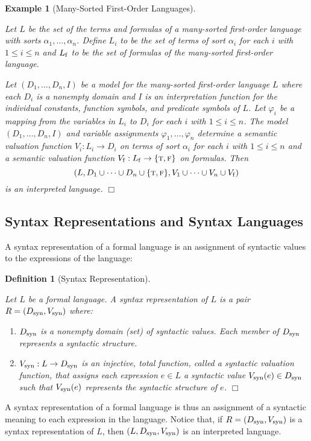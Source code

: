 \documentclass[11pt,fleqn]{article}
\newcommand{\be}{\begin{enumerate}}
\newcommand{\ee}{\end{enumerate}}
\newcommand{\bsp}{\begin{sloppypar}}
\newcommand{\esp}{\end{sloppypar}}
\renewcommand{\phi}{\varphi}
\newcommand{\set}[1]{{\{ #1 \}}}
\newcommand{\tarrow}{\rightarrow}
\newcommand{\TRUE}{\mbox{{\sc t}}}
\newcommand{\FALSE}{\mbox{{\sc f}}}
\newtheorem{eg}[thm]{Example}
\newtheorem{df}[thm]{Definition}
\begin{document}
\begin{eg}[Many-Sorted First-Order Languages] \label{eg:ms-fol} \em
\bsp Let $L$ be the set of the terms and formulas of a many-sorted
first-order language with sorts $\alpha_1,\ldots,\alpha_n$.  Define
$L_i$ to be the set of terms of sort $\alpha_i$ for each $i$ with $1
\le i \le n$ and $L_{\rm f}$ to be the set of formulas of the
many-sorted first-order language. \esp

Let $(D_1,\ldots,D_n,I)$ be a model for the many-sorted first-order
language $L$ where each $D_i$ is a nonempty domain and $I$ is an
interpretation function for the individual constants, function
symbols, and predicate symbols of $L$.  Let $\phi_i$ be a mapping from
the variables in $L_i$ to $D_i$ for each $i$ with $1 \le i \le n$.
The model $(D_1,\ldots,D_n,I)$ and variable assignments
$\phi_1,\ldots,\phi_n$ determine a semantic valuation function $V_i :
L_i \tarrow D_i$ on terms of sort $\alpha_i$ for each $i$ with $1 \le
i \le n$ and a semantic valuation function $V_{\rm f} : L_{\rm f}
\tarrow \set{\TRUE,\FALSE}$ on formulas.  Then \[(L,D_1 \cup \cdots
\cup D_n \cup \set{\TRUE,\FALSE}, V_1 \cup \cdots \cup V_n \cup V_{\rm
  f})\] is an interpreted language. \hfill $\Box$
\end{eg}

\subsection{Syntax Representations and Syntax Languages}

A syntax representation of a formal language is an assignment of
syntactic values to the expressions of the language:

\begin{df}[Syntax Representation] \label{df:syn-rep} \em \bsp
Let $L$ be a formal language. A \emph{syntax representation} of $L$ is
a pair $R=(D_{\rm syn},V_{\rm syn})$ where:

\be

  \item $D_{\rm syn}$ is a nonempty domain (set) of \emph{syntactic
    values}.  Each member of $D_{\rm syn}$ represents a syntactic
    structure.

  \item $V_{\rm syn} : L \tarrow D_{\rm syn}$ is an injective, total
    function, called a \emph{syntactic valuation function}, that
    assigns each expression $e \in L$ a syntactic value $V_{\rm
      syn}(e) \in D_{\rm syn}$ such that $V_{\rm syn}(e)$ represents
    the syntactic structure of $e$. \hfill $\Box$

\ee 
\esp
\end{df}
A syntax representation of a formal language is thus an assignment of
a syntactic meaning to each expression in the language.  Notice that,
if $R=(D_{\rm syn},V_{\rm syn})$ is a syntax representation of $L$,
then $(L,D_{\rm syn},V_{\rm syn})$ is an interpreted language.
\end{document}
